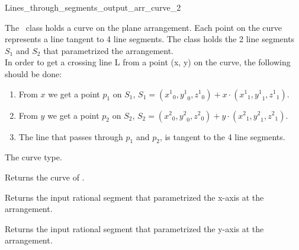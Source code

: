 \begin {ccRefClass} {Lines_through_segments_output_arr_curve_2}
    
\ccDefinition 

The \ccRefName\ class holds a curve on the plane arrangement. Each point on the curve represents a line tangent to 4 line segments. The class holds the 2 line segments $S_1$ and $S_2$ that parametrized the arrangement.\\
In order to get a crossing line L from a point (x, y) on the curve, the following should be done:

\begin{enumerate}
\item 
From $x$ we get a point $p_1$ on $S_1$, $S_1 = ({x^1}_0,{y^1}_0,{z^1}_0) + x \cdot ({x^1}_1,{y^1}_1,{z^1}_1)$.
\item
From $y$ we get a point $p_2$ on $S_2$, $S_2 = ({x^2}_0,{y^2}_0,{z^2}_0) + y \cdot ({x^2}_1,{y^2}_1,{z^2}_1)$.
\item
The line that passes through $p_1$ and $p_2$, is tangent to the 4 line segments.
\end{enumerate}


\ccTypes
{} {The curve type.}

\ccAccessFunctions
{}

         {Returns the curve of \ccVar{}.}

         {Returns the input rational segment that parametrized the x-axis at the arrangement.}

         {Returns the input rational segment that parametrized the y-axis at the arrangement.}

\ccSeeAlso
{}\\
\\
\\
\\
\\



\end{ccRefClass} 

